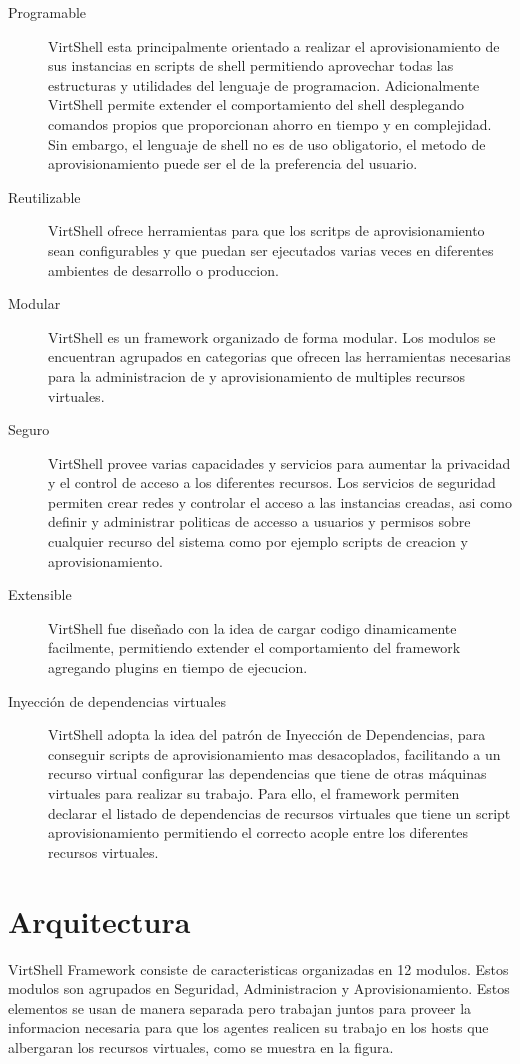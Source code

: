 \begin{description}
\item [Programable] VirtShell esta principalmente orientado a realizar el aprovisionamiento de sus instancias en scripts de shell permitiendo aprovechar todas las estructuras y utilidades del lenguaje de programacion. Adicionalmente VirtShell permite extender el comportamiento del shell desplegando comandos propios que proporcionan ahorro en tiempo y en complejidad. Sin embargo, el lenguaje de shell no es de uso obligatorio, el  metodo de aprovisionamiento puede ser el de la preferencia del usuario. 
\item [Reutilizable] VirtShell ofrece herramientas para que los scritps de aprovisionamiento sean configurables y que puedan ser ejecutados varias veces en diferentes ambientes de desarrollo o produccion.
\item [Modular] VirtShell es un framework organizado de forma modular. Los modulos se encuentran agrupados en categorias que ofrecen las herramientas necesarias para la administracion de y aprovisionamiento de multiples recursos virtuales.
\item [Seguro] VirtShell provee varias capacidades y servicios para aumentar la privacidad y el control de acceso a los diferentes recursos. Los servicios de seguridad permiten crear redes y controlar el acceso a las instancias creadas, asi como definir y administrar politicas de accesso a usuarios y permisos sobre cualquier recurso del sistema como por ejemplo scripts de creacion y aprovisionamiento.
\item [Extensible] VirtShell fue diseñado con la idea de cargar codigo dinamicamente facilmente, permitiendo extender el comportamiento del framework agregando plugins en tiempo de ejecucion.
\item [Inyección de dependencias virtuales] VirtShell adopta la idea del patrón de Inyección de Dependencias, para conseguir scripts de aprovisionamiento mas desacoplados, facilitando a un recurso virtual configurar las dependencias que tiene de otras máquinas virtuales para realizar su trabajo. Para ello, el framework permiten declarar el listado de dependencias de recursos virtuales que tiene un script aprovisionamiento permitiendo el correcto acople entre los diferentes recursos virtuales. 
\end{description}

\section{Arquitectura}
VirtShell Framework consiste de caracteristicas organizadas en 12 modulos. Estos modulos son agrupados en Seguridad, Administracion y Aprovisionamiento. Estos elementos se usan de manera separada pero trabajan juntos para proveer la informacion necesaria para que los agentes realicen su trabajo en los hosts que albergaran los recursos virtuales, como se muestra en la figura. \\

